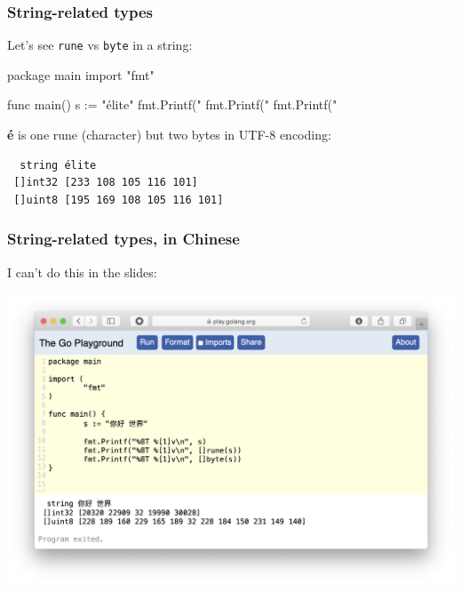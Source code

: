 \documentclass[handout,compress,t,11pt]{beamer}
\begin{document}
\begin{frame}[fragile]
    \frametitle{String-related types}
    Let's see \verb|rune| vs \verb|byte| in a string:
\begin{golang}
package main
import "fmt"

func main() {
    s := "élite"
	fmt.Printf("%
	fmt.Printf("%
	fmt.Printf("%
}
\end{golang}
\vspace{0.5\baselineskip}
{\bf é} is one rune (character) but two bytes in UTF-8 encoding:
\begin{verbatim}
  string élite
 []int32 [233 108 105 116 101]
 []uint8 [195 169 108 105 116 101]
\end{verbatim}
\end{frame}

\begin{frame}[fragile]
\frametitle{String-related types, in Chinese}
I can't do this in the slides:
    \vspace{-0.4\baselineskip}
\begin{center}
\includegraphics[height=0.9\textheight]{go-playground-chinese.png}
\end{center}
\end{frame}
\end{document}
